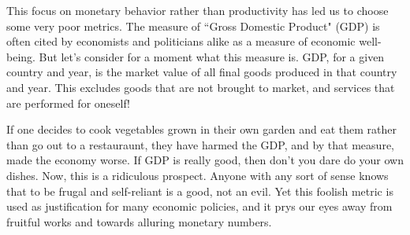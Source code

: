 \documentclass[letterpaper]{article}
\begin{document}


This focus on monetary behavior rather than productivity has led us to choose some very poor metrics. The measure of ``Gross Domestic Product" (GDP) is often cited by economists and politicians alike as a measure of economic well-being. But let's consider for a moment what this measure is. GDP, for a given country and year, is the market value of all final goods produced in that country and year. This excludes goods that are not brought to market, and services that are performed for oneself!

If one decides to cook vegetables grown in their own garden and eat them rather than go out to a restauraunt, they have harmed the GDP, and by that measure, made the economy worse. If GDP is really good, then don't you dare do your own dishes. Now, this is a ridiculous prospect. Anyone with any sort of sense knows that to be frugal and self-reliant is a good, not an evil. Yet this foolish metric is used as justification for many economic policies, and it prys our eyes away from fruitful works and towards alluring monetary numbers.
\end{document}
